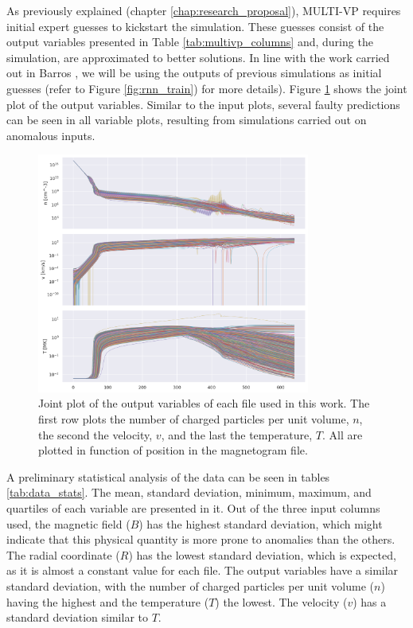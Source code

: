 As previously explained (chapter \ref{chap:research_proposal}), MULTI-VP requires initial expert guesses to kickstart the simulation. These guesses consist of the output variables presented in Table \ref{tab:multivp_columns} and, during the simulation, are approximated to better solutions. In line with the work carried out in Barros \cite{barros_InitialConditionEstimation_}, we will be using the outputs of previous simulations as initial guesses (refer to Figure \ref{fig:rnn_train}) for more details). Figure \ref{fig:jointplot_output} shows the joint plot of the output variables. Similar to the input plots, several faulty predictions can be seen in all variable plots, resulting from simulations carried out on anomalous inputs.

\begin{figure}
    \centering
    \includegraphics[width=0.8\textwidth]{figures/joint_output_cols.png}
    \caption{Joint plot of the output variables of each file used in this work. The first row plots the number of charged particles per unit volume, $n$, the second the velocity, $v$, and the last the temperature, $T$. All are plotted in function of position in the magnetogram file.}
    \label{fig:jointplot_output}
\end{figure}

A preliminary statistical analysis of the data can be seen in tables \ref{tab:data_stats}. The mean, standard deviation, minimum, maximum, and quartiles of each variable are presented in it. Out of the three input columns used, the magnetic field ($B$) has the highest standard deviation, which might indicate that this physical quantity is more prone to anomalies than the others. The radial coordinate ($R$) has the lowest standard deviation, which is expected, as it is almost a constant value for each file. The output variables have a similar standard deviation, with the number of charged particles per unit volume ($n$) having the highest and the temperature ($T$) the lowest. The velocity ($v$) has a standard deviation similar to $T$.

